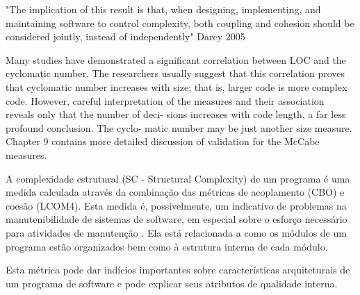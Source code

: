 \cite{Tegarden1995}

"The implication of this result is that, when
designing, implementing, and maintaining software to control complexity, both coupling and cohesion should be considered jointly,
instead of independently" Darcy 2005

Many studies have demonstrated a significant correlation between
LOC and the cyclomatic number. The researchers usually suggest that
this correlation proves that cyclomatic number increases with size; that
is, larger code is more complex code. However, careful interpretation of
the measures and their association reveals only that the number of deci-
sions increases with code length, a far less profound conclusion. The cyclo-
matic number may be just another size measure. Chapter 9 contains more
detailed discussion of validation for the McCabe measures.

A complexidade estrutural (SC - Structural Complexity) de um programa é uma
medida calculada através da combinação das métricas de acoplamento (CBO) e
coesão (LCOM4). Esta medida é, possivelmente, um indicativo de problemas na
manutenibilidade de sistemas de software, em especial sobre o esforço
necessário para atividades de manutenção \cite{Terceiro2012}. Ela está
relacionada a como os módulos de um programa estão organizados bem como à
estrutura interna de cada módulo.

Esta métrica pode dar indícios importantes sobre características arquiteturais
de um programa de software e pode explicar seus atributos de qualidade
interna.
